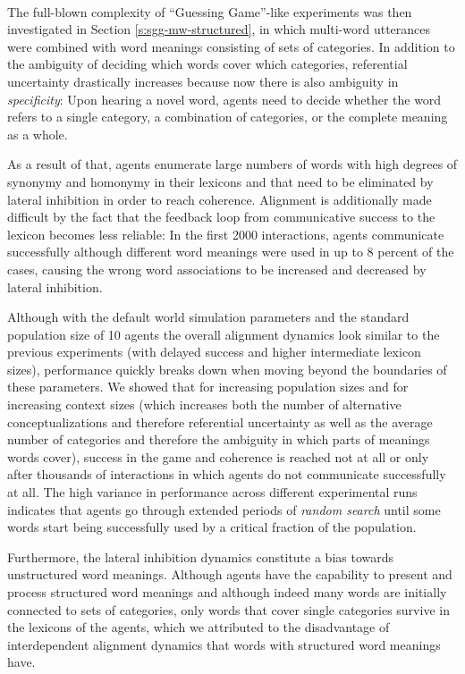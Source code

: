 ~\\


The full-blown complexity of ``Guessing Game''-like experiments was
then investigated in Section \ref{s:sgg-mw-structured}, in which
multi-word utterances were combined with word meanings consisting of
sets of categories. In addition to the ambiguity of deciding which
words cover which categories, referential uncertainty drastically
increases because now there is also ambiguity in \emph{specificity}:
Upon hearing a novel word, agents need to decide whether the word
refers to a single category, a combination of categories, or the
complete meaning as a whole.

As a result of that, agents enumerate large numbers of words with high
degrees of synonymy and homonymy in their lexicons and that need to be
eliminated by lateral inhibition in order to reach
coherence. Alignment is additionally made difficult by the fact that
the feedback loop from communicative success to the lexicon becomes
less reliable: In the first 2000 interactions, agents communicate
successfully although different word meanings were used in up to 8
percent of the cases, causing the wrong word associations to be
increased and decreased by lateral inhibition.

Although with the default world simulation parameters and the standard
population size of 10 agents the overall alignment dynamics look
similar to the previous experiments (with delayed success and higher
intermediate lexicon sizes), performance quickly breaks down when
moving beyond the boundaries of these parameters. We showed that for
increasing population sizes and for increasing context sizes (which
increases both the number of alternative conceptualizations and
therefore referential uncertainty as well as the average number of
categories and therefore the ambiguity in which parts of meanings
words cover), success in the game and coherence is reached not at all
or only after thousands of interactions in which agents do not
communicate successfully at all. The high variance in performance
across different experimental runs indicates that agents go through
extended periods of \emph{random search} until some words start being
successfully used by a critical fraction of the population.

Furthermore, the lateral inhibition dynamics constitute a bias towards
unstructured word meanings. Although agents have the capability to
present and process structured word meanings and although indeed many
words are initially connected to sets of categories, only words that
cover single categories survive in the lexicons of the agents, which
we attributed to the disadvantage of interdependent alignment dynamics
that words with structured word meanings have.

